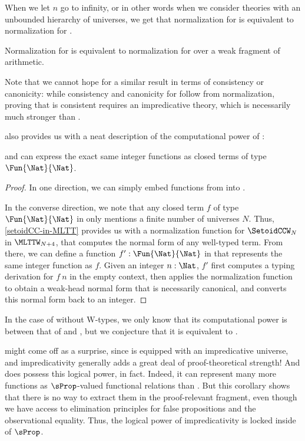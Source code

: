 When we let \( n \) go to infinity, or in other words when we consider theories 
with an unbounded hierarchy of universes, we get that
normalization for \MLTTW is equivalent to normalization for \SetoidCCW.

\begin{corollary}
  Normalization for \SetoidCCW is equivalent to normalization for \MLTTW
  over a weak fragment of arithmetic.
\end{corollary}

Note that we cannot hope for a similar result in terms of consistency or
canonicity: while consistency and canonicity for \MLTTW follow from
normalization, proving that \SetoidCCW is consistent requires an impredicative
theory, which is necessarily much stronger than \MLTTW.

 also provides us with a neat description of the
computational power of \SetoidCCW:

\begin{corollary}\label{integer-functions}
  \SetoidCCW and \MLTTW can express the exact same integer functions
  as closed terms of type \( \Fun{\Nat}{\Nat} \).
\end{corollary}

\begin{proof}
  In one direction, we can simply embed functions from \MLTTW into \SetoidCCW.

  In the converse direction, we note that any closed term \( f \) of
  type \( \Fun{\Nat}{\Nat} \) in \SetoidCCW only mentions a finite number of
  universes \( N \).
  Thus, \cref{setoidCC-in-MLTT} provides us with a normalization function for 
  \( \SetoidCCW_N \) in \( \MLTTW_{N+4} \), that computes the normal form of any 
  well-typed term. 
  From there, we can define a function \( f' : \Fun{\Nat}{\Nat} \) in \MLTTW
  that represents the same integer function as \( f \).
  Given an integer \( n : \Nat \), \( f' \) first computes a \SetoidCCW typing 
  derivation for \( f\ n \) in the empty context, then applies the 
  normalization function to obtain a weak-head normal form that is necessarily
  canonical, and converts this normal form back to an integer.
\end{proof}
%
In the case of \SetoidCC without \( \mathrm{W} \)-types, we only know that its
computational power is between that of \MLTT and \MLTTW, but we conjecture that
it is equivalent to \MLTT.

 might come off as a surprise, since \SetoidCC is 
equipped with an impredicative universe, and impredicativity generally adds
a great deal of proof-theoretical strength!
%
And \SetoidCC does possess this logical power, in fact. Indeed, it can
represent many more functions as \( \sProp \)-valued functional relations
than \MLTT. But this corollary shows that there is no way to extract them
in the proof-relevant fragment, even though we have access to elimination
principles for false propositions and the observational equality.
%
Thus, the logical power of impredicativity is locked inside of \( \sProp \).

